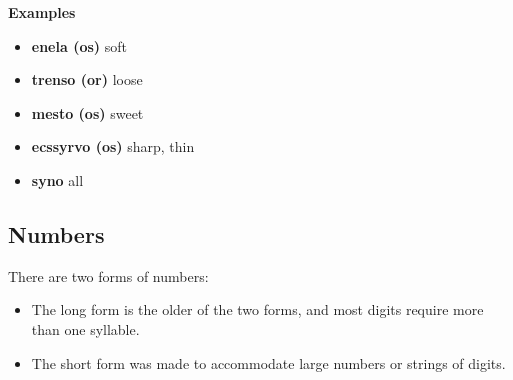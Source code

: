 \textbf{Examples}

\begin{itemize}
  \item \textbf{enela (os)} soft
  \item \textbf{trenso (or)} loose
  \item \textbf{mesto (os)} sweet
  \item \textbf{ecssyrvo (os)} sharp, thin
  \item \textbf{syno} all
\end{itemize}

\subsection{Numbers}

There are two forms of numbers:

\begin{itemize}
  \item The long form is the older of the two forms, and most digits require more than one syllable.
  \item The short form was made to accommodate large numbers or strings of digits.
\end{itemize}

